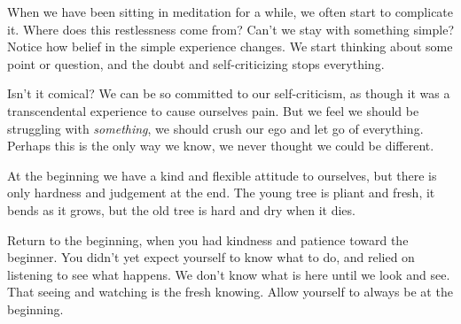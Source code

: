 When we have been sitting in meditation for a while, we often start to
complicate it. Where does this restlessness come from? Can't we stay
with something simple? Notice how belief in the simple experience
changes. We start thinking about some point or question, and the doubt
and self-criticizing stops everything.

Isn't it comical? We can be so committed to our self-criticism, as
though it was a transcendental experience to cause ourselves pain. But
we feel we should be struggling with \emph{something}, we should crush
our ego and let go of everything. Perhaps this is the only way we know,
we never thought we could be different.

At the beginning we have a kind and flexible attitude to ourselves, but
there is only hardness and judgement at the end. The young tree is
pliant and fresh, it bends as it grows, but the old tree is hard and dry
when it dies.

Return to the beginning, when you had kindness and patience toward the
beginner. You didn't yet expect yourself to know what to do, and relied
on listening to see what happens. We don't know what is here until we
look and see. That seeing and watching is the fresh knowing. Allow
yourself to always be at the beginning.
